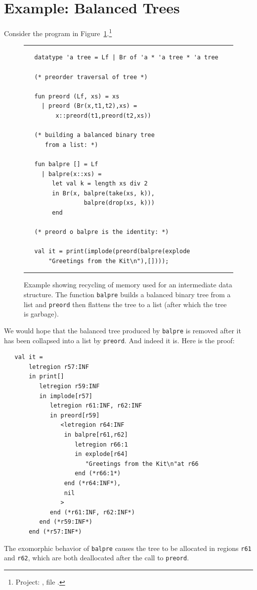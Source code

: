 \documentclass[12pt]{book}
\begin{document}
\section{Example: Balanced Trees}
Consider the program in Figure~\ref{balpre.fig}.\footnote{Project:
  , file .}
\begin{figure} 
\hrule 
\medskip
\begin{verbatim}
   datatype 'a tree = Lf | Br of 'a * 'a tree * 'a tree

   (* preorder traversal of tree *)

   fun preord (Lf, xs) = xs
     | preord (Br(x,t1,t2),xs) = 
         x::preord(t1,preord(t2,xs))

   (* building a balanced binary tree 
      from a list: *)

   fun balpre [] = Lf
     | balpre(x::xs) = 
        let val k = length xs div 2
        in Br(x, balpre(take(xs, k)),
                 balpre(drop(xs, k)))
        end

   (* preord o balpre is the identity: *)

   val it = print(implode(preord(balpre(explode 
       "Greetings from the Kit\n"),[])));
\end{verbatim}
\caption{Example showing recycling of memory used for an intermediate 
  data structure. The function {\tt balpre} builds a balanced binary
  tree from a list and {\tt preord} then flattens the tree to a list
  (after which the tree is garbage).}  
\medskip \hrule
\label{balpre.fig}
\end{figure}
We would hope that the balanced tree produced by {\tt balpre} is
removed after it has been collapsed into a list by {\tt preord}.  And
indeed it is. Here is the proof:
\begin{verbatim}
   val it = 
       letregion r57:INF 
       in print[] 
          letregion r59:INF 
          in implode[r57] 
             letregion r61:INF, r62:INF 
             in preord[r59] 
                <letregion r64:INF 
                 in balpre[r61,r62] 
                    letregion r66:1 
                    in explode[r64] 
                       "Greetings from the Kit\n"at r66 
                    end (*r66:1*) 
                 end (*r64:INF*), 
                 nil
                > 
             end (*r61:INF, r62:INF*) 
          end (*r59:INF*) 
       end (*r57:INF*)
\end{verbatim}
The exomorphic behavior of {\tt balpre} causes the tree to be
allocated in regions {\tt r61} and {\tt r62}, which are both
deallocated after the call to {\tt preord}.
\end{document}
